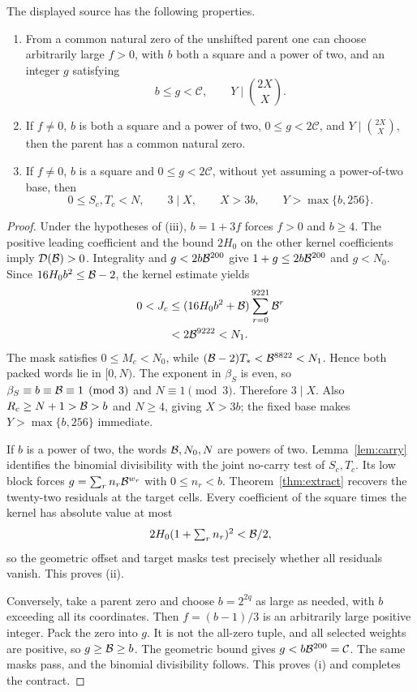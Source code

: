 \begin{proposition}
\label{prop:tensource}
The displayed source has the following properties.
\begin{enumerate}[label=\textup{(\roman*)},leftmargin=*]
\item From a common natural zero of the unshifted parent one can choose
 arbitrarily large $f>0$, with $b$ both a square and a power of two,
 and an integer $g$ satisfying
 \[
 b\le g<\mathcal C,\qquad Y\mid\binom{2X}{X}.
 \]
\item If $f\ne0$, $b$ is both a square and a power of two,
 $0\le g<2\mathcal C$, and $Y\mid\binom{2X}{X}$, then the
 parent has a common natural zero.
\item If $f\ne0$, $b$ is a square and $0\le g<2\mathcal C$,
 without yet assuming a power-of-two base, then
 \[
 0\le S_c,T_c<N,\qquad 3\mid X,\qquad
 X>3b,\qquad Y>\max\{b,256\}.
 \]
\end{enumerate}
\end{proposition}
\begin{proof}
Under the hypotheses of (iii), $b=1+3f$ forces $f>0$ and $b\ge4$.
The positive leading coefficient and the bound $2H_0$ on the other
kernel coefficients imply $\mathcal D(\mathcal B)>0$. Integrality and
$g<2b\mathcal B^{200}$ give $1+g\le2b\mathcal B^{200}$ and $g<N_0$.
Since $16H_0b^2\le\mathcal B-2$, the kernel estimate yields
\[
\begin{split}
0<J_c
&\le (16H_0b^2+\mathcal B)\sum_{r=0}^{9221}\mathcal B^r\\
&<2\mathcal B^{9222}<N_1.
\end{split}
\]
The mask satisfies $0\le M_c<N_0$, while
$(\mathcal B-2)T_*<\mathcal B^{8822}<N_1$. Hence both packed words lie in
$[0,N)$. The exponent in $\beta_S$ is even, so
$\beta_S\equiv b\equiv\mathcal B\equiv1\pmod3$ and $N\equiv1\pmod3$.
Therefore $3\mid X$. Also $R_c\ge N+1>\mathcal B>b$ and $N\ge4$,
giving $X>3b$; the fixed base makes $Y>\max\{b,256\}$ immediate.

If $b$ is a power of two, the words $\mathcal B,N_0,N$ are powers of two.
Lemma~\ref{lem:carry} identifies the binomial divisibility with the
joint no-carry test of $S_c,T_c$. Its low block forces
$g=\sum_r n_r\mathcal B^{w_r}$ with $0\le n_r<b$. Theorem~\ref{thm:extract}
recovers the twenty-two residuals at the target cells. Every coefficient
of the square times the kernel has absolute value at most
\[
 2H_0(1+\textstyle\sum_r n_r)^2<\mathcal B/2,
\]
so the geometric offset and target masks test precisely whether all
residuals vanish. This proves (ii).

Conversely, take a parent zero and choose $b=2^{2q}$ as large as needed,
with $b$ exceeding all its coordinates. Then $f=(b-1)/3$ is an arbitrarily
large positive integer. Pack the zero into $g$. It is not the all-zero
tuple, and all selected weights are positive, so $g\ge\mathcal B\ge b$.
The geometric bound gives $g<b\mathcal B^{200}=\mathcal C$.
The same masks pass, and the binomial divisibility follows. This proves
(i) and completes the contract.
\end{proof}

